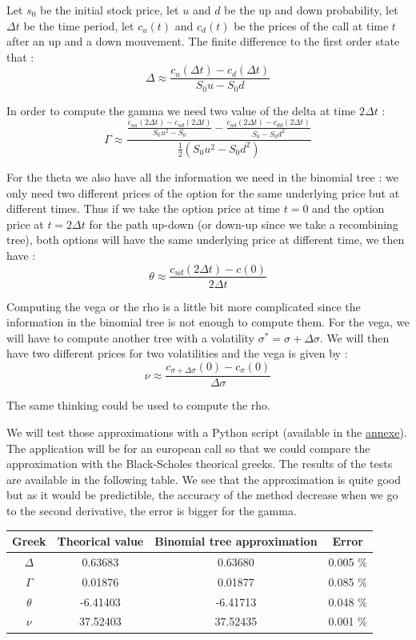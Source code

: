 \documentclass[hidelinks]{article}
\begin{document}
    Let $s_0$ be the initial stock price, let $u$ and $d$ be the up and down probability, let $\Delta t$ be the time period, let $c_u(t)$ and $c_d(t)$ be the prices of the call at time $t$ after an up and a down mouvement. 
    The finite difference to the first order state that :
    $$ \Delta \approx \frac{c_u(\Delta t) - c_d(\Delta t)}{S_0 u - S_0 d}$$
    
    In order to compute the gamma we need two value of the delta at time $2\Delta t$ :
    $$ \Gamma \approx  \frac{\frac{c_{uu}(2\Delta t) - c_{ud}(2\Delta t)}{S_0 u^2 - S_0} -  \frac{c_{ud}(2\Delta t) - c_{dd}(2\Delta t)}{S_0 - S_0 d^2}}{\frac{1}{2}(S_0 u^2 - S_0 d^2)}$$
    
    For the theta we also have all the information we need in the binomial tree : we only need two different prices of the option for the same underlying price but at different times. Thus if we take the option price at time $t=0$ and the option price at $t=2\Delta t$ for the path up-down (or down-up since we take a recombining tree), both options will have the same underlying price at different time, we then have :
    $$ \theta \approx  \frac{c_{ud}(2 \Delta t) - c(0)}{2 \Delta t}$$
    
    Computing the vega or the rho is a little bit more complicated since the information in the binomial tree is not enough to compute them. For the vega, we will have to compute another tree with a volatility $\sigma^* = \sigma + \Delta\sigma$. We will then have two different prices for two volatilities and the vega is given by :
    $$\nu \approx  \frac{c_{\sigma + \Delta \sigma}(0) - c_{\sigma}(0)}{\Delta \sigma}$$
    
    The same thinking could be used to compute the rho.
    
    We will test those approximations with a Python script (available in the \href{sec:binom}{annexe}). The application will be for an european call so that we could compare the approximation with the Black-Scholes theorical greeks. The results of the tests are available in the following table. We see that the approximation is quite good but as it would be predictible, the accuracy of the method decrease when we go to the second derivative, the error is bigger for the gamma.
    \newline
    
    
\begin{tabular}{|c|c|c|c|}
\hline
Greek & Theorical value & Binomial tree approximation & Error \\
\hline
$\Delta$ & 0.63683 & 0.63680 & 0.005 \% \\
\hline
$\Gamma$ & 0.01876 & 0.01877 & 0.085 \%\\
\hline
$\theta$ & -6.41403 & -6.41713 & 0.048 \% \\
\hline
$\nu$ & 37.52403 & 37.52435 & 0.001 \% \\
\hline
\end{tabular}
\end{document}
